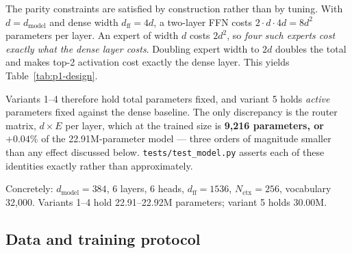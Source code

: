 \documentclass[11pt]{article}
\begin{document}
The parity constraints are satisfied by construction rather than by tuning. With
$d = d_{\text{model}}$ and dense width $d_{\text{ff}} = 4d$, a two-layer FFN
costs $2 \cdot d \cdot 4d = 8d^2$ parameters per layer. An expert of width $d$
costs $2d^2$, so \emph{four such experts cost exactly what the dense layer
costs}. Doubling expert width to $2d$ doubles the total and makes top-2
activation cost exactly the dense layer. This yields Table~\ref{tab:p1-design}.

\begin{table}[t]
\centering
\caption{The five feed-forward variants. $E$ = routed experts, $k$ = experts used
per token. Per-layer FFN parameters, ignoring the router.}
\label{tab:p1-design}
\end{table}

\noindent
Variants 1--4 therefore hold total parameters fixed, and variant 5 holds
\emph{active} parameters fixed against the dense baseline. The only discrepancy
is the router matrix, $d \times E$ per layer, which at the trained size is
\textbf{9{,}216 parameters, or $+0.04\%$} of the 22.91M-parameter model ---
three orders of magnitude smaller than any effect discussed below.
\texttt{tests/test\_model.py} asserts each of these identities exactly rather
than approximately.

Concretely: $d_{\text{model}}{=}384$, 6 layers, 6 heads, $d_{\text{ff}}{=}1536$,
$N_{\text{ctx}}{=}256$, vocabulary 32{,}000. Variants 1--4 hold 22.91--22.92M
parameters; variant 5 holds 30.00M.

\subsection{Data and training protocol}
\end{document}
